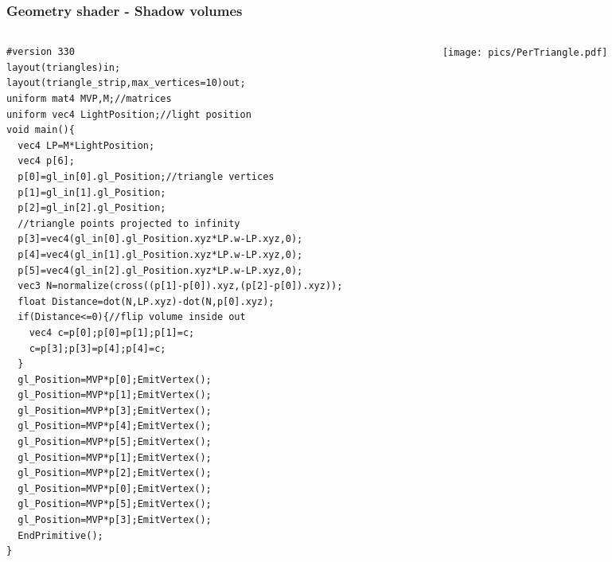 \begin{frame}[fragile]
\frametitle{Geometry shader - Shadow volumes}
  \begin{columns}[T]
    \begin{column}{.44\textwidth}
{\tiny
\begin{verbatim}
#version 330
layout(triangles)in;
layout(triangle_strip,max_vertices=10)out;
uniform mat4 MVP,M;//matrices
uniform vec4 LightPosition;//light position
void main(){
  vec4 LP=M*LightPosition;
  vec4 p[6];
  p[0]=gl_in[0].gl_Position;//triangle vertices
  p[1]=gl_in[1].gl_Position;
  p[2]=gl_in[2].gl_Position;
  //triangle points projected to infinity
  p[3]=vec4(gl_in[0].gl_Position.xyz*LP.w-LP.xyz,0);
  p[4]=vec4(gl_in[1].gl_Position.xyz*LP.w-LP.xyz,0);
  p[5]=vec4(gl_in[2].gl_Position.xyz*LP.w-LP.xyz,0);
  vec3 N=normalize(cross((p[1]-p[0]).xyz,(p[2]-p[0]).xyz));
  float Distance=dot(N,LP.xyz)-dot(N,p[0].xyz);
  if(Distance<=0){//flip volume inside out
    vec4 c=p[0];p[0]=p[1];p[1]=c;
    c=p[3];p[3]=p[4];p[4]=c;
  }
  gl_Position=MVP*p[0];EmitVertex();
  gl_Position=MVP*p[1];EmitVertex();
  gl_Position=MVP*p[3];EmitVertex();
  gl_Position=MVP*p[4];EmitVertex();
  gl_Position=MVP*p[5];EmitVertex();
  gl_Position=MVP*p[1];EmitVertex();
  gl_Position=MVP*p[2];EmitVertex();
  gl_Position=MVP*p[0];EmitVertex();
  gl_Position=MVP*p[5];EmitVertex();
  gl_Position=MVP*p[3];EmitVertex();
  EndPrimitive();
}
\end{verbatim}
}
    \end{column}
    \begin{column}{.48\textwidth}
	    \begin{figure}[h]
    		\texttt{[image: pics/PerTriangle.pdf]}
    	\end{figure}
    \end{column}
  \end{columns}

\end{frame}

